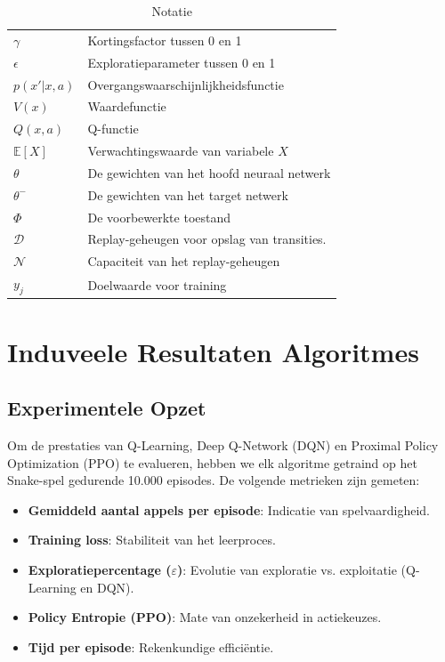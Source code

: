 \documentclass[a4paper,11pt]{report}
\begin{document}
\begin{table}[h]
\begin{tabular}{>{\raggedright}p{2.5cm} >{\raggedright\arraybackslash}p{10cm}}
        $\gamma$                 & Kortingsfactor tussen 0 en 1                \\
        $\epsilon$               & Exploratieparameter tussen 0 en 1           \\
        $p(x'|x, a)$             & Overgangswaarschijnlijkheidsfunctie         \\
        $V(x)$                   & Waardefunctie                               \\
        $Q(x, a)$                & Q-functie                                   \\
        $\mathbb{E}[X]$          & Verwachtingswaarde van variabele $X$        \\
        $\theta$                 & De gewichten van het hoofd neuraal netwerk  \\
        $\theta^-$               & De gewichten van het target netwerk         \\
        $\Phi$                   & De voorbewerkte toestand                    \\
        $\mathcal{D}$            & Replay-geheugen voor opslag van transities. \\
        $\mathcal{N}$            & Capaciteit van het replay-geheugen          \\
        $y_j$                    & Doelwaarde voor training                    \\

    \end{tabular}
    \caption{Notatie}
\end{table}

\chapter{Induveele Resultaten Algoritmes}

\section{Experimentele Opzet}
Om de prestaties van Q-Learning, Deep Q-Network (DQN) en Proximal Policy
Optimization (PPO) te evalueren, hebben we elk algoritme getraind op het
Snake-spel gedurende 10.000 episodes. De volgende metrieken zijn gemeten:

\begin{itemize}
    \item \textbf{Gemiddeld aantal appels per episode}: Indicatie van spelvaardigheid.
    \item \textbf{Training loss}: Stabiliteit van het leerproces.
    \item \textbf{Exploratiepercentage ($\varepsilon$)}: Evolutie van exploratie vs. exploitatie (Q-Learning en DQN).
    \item \textbf{Policy Entropie (PPO)}: Mate van onzekerheid in actiekeuzes.
    \item \textbf{Tijd per episode}: Rekenkundige efficiëntie.
\end{itemize}
\end{document}
